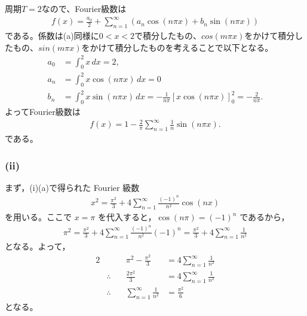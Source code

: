 \documentclass[platex,dvipdfmx,a4paper]{jsarticle}
\begin{document}
  周期$T=2$なので、Fourier級数は
  \begin{align*}
    f(x)=\frac{a_0}{2}+\sum_{n=1}^\infty\left(a_n\cos(n\pi x)+b_n\sin(n\pi x)\right)
  \end{align*}
  である。係数は(a)同様に$0<x<2$で積分したもの、$cos(m\pi x)$をかけて積分したもの、$sin(m\pi x)$をかけて積分したものを考えることで以下となる。
  \begin{align*}
    a_0&=\int_0^2 x\,dx=2,\\
    a_n&=\int_0^2 x\cos(n\pi x)\,dx=0\\
    b_n&=\int_0^2 x\sin(n\pi x)\,dx=-\frac{1}{n\pi}\left[x\cos(n\pi x)\right]_0^2=-\frac{2}{n\pi}. 
  \end{align*}
  よってFourier級数は
  \begin{align*}
    f(x)=1-\frac{2}{\pi}\sum_{n=1}^\infty\frac{1}{n}\sin(n\pi x).
  \end{align*}
  である。
  \subsubsection*{(ii)}


  まず，(i)(a)で得られた Fourier 級数
  \begin{align*}
    x^2=\frac{\pi^2}{3}+4\sum_{n=1}^{\infty}\frac{(-1)^n}{n^2}\cos(nx)
  \end{align*}
  を用いる。ここで $x=\pi$ を代入すると，$\cos(n\pi)=(-1)^n$ であるから，
  \begin{align*}
    \pi^2=\frac{\pi^2}{3}+4\sum_{n=1}^{\infty}\frac{(-1)^n}{n^2}(-1)^n
        =\frac{\pi^2}{3}+4\sum_{n=1}^{\infty}\frac{1}{n^2}
  \end{align*}
  となる。よって，
  \begin{alignat*}{2}
    &\phantom{\therefore\quad} & \pi^2-\frac{\pi^2}{3} &= 4\sum_{n=1}^{\infty}\frac{1}{n^2}\\
    &\therefore\quad           & \frac{2\pi^2}{3}      &= 4\sum_{n=1}^{\infty}\frac{1}{n^2}\\
    &\therefore\quad           & \sum_{n=1}^{\infty}\frac{1}{n^2} &= \frac{\pi^2}{6}
  \end{alignat*}
  となる。

\end{document}
